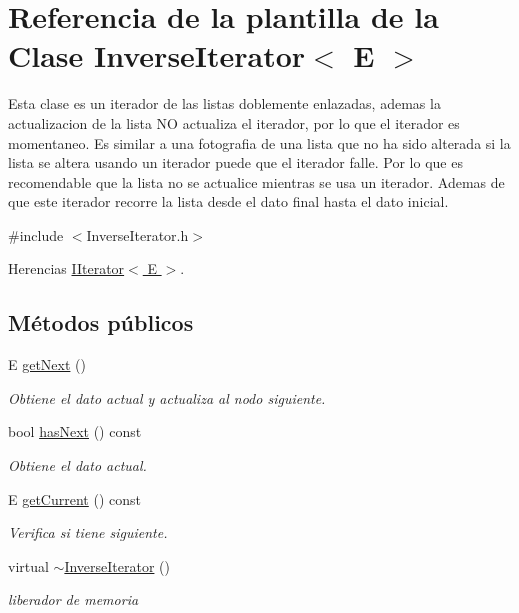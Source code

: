 \hypertarget{classInverseIterator}{\section{Referencia de la plantilla de la Clase Inverse\-Iterator$<$ E $>$}
\label{classInverseIterator}
}


Esta clase es un iterador de las listas doblemente enlazadas, ademas la actualizacion de la lista N\-O actualiza el iterador, por lo que el iterador es momentaneo. Es similar a una fotografia de una lista que no ha sido alterada si la lista se altera usando un iterador puede que el iterador falle. Por lo que es recomendable que la lista no se actualice mientras se usa un iterador. Ademas de que este iterador recorre la lista desde el dato final hasta el dato inicial.  




{\ttfamily \#include $<$Inverse\-Iterator.\-h$>$}



Herencias \hyperlink{classIIterator}{I\-Iterator$<$ E $>$}.

\subsection*{Métodos públicos}
\begin{DoxyCompactItemize}
\item 
E \hyperlink{classInverseIterator_a4c1d8ceb8264f7f8186b6244a0a62940}{get\-Next} ()
\begin{DoxyCompactList}\small\item\em Obtiene el dato actual y actualiza al nodo siguiente. \end{DoxyCompactList}\item 
bool \hyperlink{classInverseIterator_a86973781dfa84df67be2843fc4545692}{has\-Next} () const 
\begin{DoxyCompactList}\small\item\em Obtiene el dato actual. \end{DoxyCompactList}\item 
E \hyperlink{classInverseIterator_afdbb5c310621c773da10dfb5bc3b1a4c}{get\-Current} () const 
\begin{DoxyCompactList}\small\item\em Verifica si tiene siguiente. \end{DoxyCompactList}\item 
\hypertarget{classInverseIterator_ae3b6736187c1dbc82ead0277d31e5898}{virtual \hyperlink{classInverseIterator_ae3b6736187c1dbc82ead0277d31e5898}{$\sim$\-Inverse\-Iterator} ()}\label{classInverseIterator_ae3b6736187c1dbc82ead0277d31e5898}

\begin{DoxyCompactList}\small\item\em liberador de memoria \end{DoxyCompactList}\end{DoxyCompactItemize}
